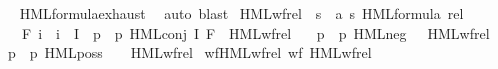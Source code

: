 \begin{isabellebody}
%
\isadelimproof
\ \ %
\endisadelimproof
%
\isatagproof
{}\isamarkupfalse%
\ HML{\isacharunderscore}{\kern0pt}formula{\isachardot}{\kern0pt}exhaust\ \isamarkupfalse%
\ {\isacharparenleft}{\kern0pt}auto{\isacharcomma}{\kern0pt}\ blast{\isacharparenright}{\kern0pt}%
\endisatagproof
{\isafoldproof}%
%
\isadelimproof
\isanewline
%
\endisadelimproof
\isanewline
{}\isamarkupfalse%
\ HML{\isacharunderscore}{\kern0pt}wf{\isacharunderscore}{\kern0pt}rel\ {\isacharcolon}{\kern0pt}{\isacharcolon}{\kern0pt}\ {\isacartoucheopen}{\isacharparenleft}{\kern0pt}{\isacharprime}{\kern0pt}s\ {\isasymtimes}\ {\isacharparenleft}{\kern0pt}{\isacharprime}{\kern0pt}a{\isacharcomma}{\kern0pt}\ {\isacharprime}{\kern0pt}s{\isacharparenright}{\kern0pt}\ HML{\isacharunderscore}{\kern0pt}formula{\isacharparenright}{\kern0pt}\ rel{\isacartoucheclose}\ \isanewline
\ \ {\isacartoucheopen}{\isasymphi}\ {\isacharequal}{\kern0pt}\ F\ i\ {\isasymand}\ i\ {\isasymin}\ I\ {\isasymLongrightarrow}\ {\isacharparenleft}{\kern0pt}{\isacharparenleft}{\kern0pt}p{\isacharcomma}{\kern0pt}\ {\isasymphi}{\isacharparenright}{\kern0pt}{\isacharcomma}{\kern0pt}\ {\isacharparenleft}{\kern0pt}p{\isacharcomma}{\kern0pt}\ HML{\isacharunderscore}{\kern0pt}conj\ I\ F{\isacharparenright}{\kern0pt}{\isacharparenright}{\kern0pt}\ {\isasymin}\ HML{\isacharunderscore}{\kern0pt}wf{\isacharunderscore}{\kern0pt}rel{\isacartoucheclose}\ {\isacharbar}{\kern0pt}\isanewline
\ \ {\isacartoucheopen}{\isacharparenleft}{\kern0pt}{\isacharparenleft}{\kern0pt}p{\isacharcomma}{\kern0pt}\ {\isasymphi}{\isacharparenright}{\kern0pt}{\isacharcomma}{\kern0pt}\ {\isacharparenleft}{\kern0pt}p{\isacharcomma}{\kern0pt}\ HML{\isacharunderscore}{\kern0pt}neg\ {\isasymphi}{\isacharparenright}{\kern0pt}{\isacharparenright}{\kern0pt}\ {\isasymin}\ HML{\isacharunderscore}{\kern0pt}wf{\isacharunderscore}{\kern0pt}rel{\isacartoucheclose}\ {\isacharbar}{\kern0pt}\isanewline
\ \ {\isacartoucheopen}{\isacharparenleft}{\kern0pt}{\isacharparenleft}{\kern0pt}p{\isacharcomma}{\kern0pt}\ {\isasymphi}{\isacharparenright}{\kern0pt}{\isacharcomma}{\kern0pt}\ {\isacharparenleft}{\kern0pt}p{\isacharprime}{\kern0pt}{\isacharcomma}{\kern0pt}\ HML{\isacharunderscore}{\kern0pt}poss\ {\isasymalpha}\ {\isasymphi}{\isacharparenright}{\kern0pt}{\isacharparenright}{\kern0pt}\ {\isasymin}\ HML{\isacharunderscore}{\kern0pt}wf{\isacharunderscore}{\kern0pt}rel{\isacartoucheclose}\isanewline
\isanewline
{}\isamarkupfalse%
\ wf{\isacharunderscore}{\kern0pt}HML{\isacharunderscore}{\kern0pt}wf{\isacharunderscore}{\kern0pt}rel{\isacharcolon}{\kern0pt}\ {\isacartoucheopen}wf\ HML{\isacharunderscore}{\kern0pt}wf{\isacharunderscore}{\kern0pt}rel{\isacartoucheclose}\ \isanewline

\end{isabellebody}
